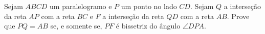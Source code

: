 Sejam $ABCD$ um paralelogramo e $P$ um ponto no lado $CD$. Sejam $Q$ a interseção da reta $AP$ com a reta $BC$ e $F$ a interseção da reta $QD$ com a reta $AB$. Prove que $PQ = AB$ se, e somente se, $PF$ é bissetriz do ângulo $\angle DPA$. 
